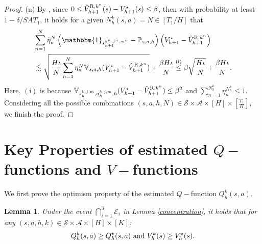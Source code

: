 \documentclass{article}
\newtheorem{lemma}{Lemma}[section]
\newcommand{\R}{\textnormal{R}}
\begin{document}
\begin{proof}
    (n)  By , since $0 \leq \hat{V}_{h+1}^{\R,k^n}(s)-V_{h+1}^{\star}(s) \leq \beta$, then with probability at least $1-\delta/SAT_1$, it holds for a given $N_h^k(s,a) = N \in [T_1/H]$ that
\begin{align*}
    &\sum_{n=1}^{N} \Tilde{\eta}_n^{N}\left(\mathbbm{1}_{s_{h+1}^{k^n,j^n,m^n}}-\mathbb{P}_{s, a,h}\right)\left(V_{h+1}^{\star}-\hat{V}_{h+1}^{\R,k^n}\right)\nonumber\\
    &\lesssim \sqrt{\frac{H\iota}{N} \sum_{n=1}^{N} \eta_n^{N} \mathbb{V}_{s, a,h}(V_{h+1}^{\star}-\hat{V}_{h+1}^{\R,k^n})} + \frac{\beta H\iota}{N} \overset{\mathrm{(i)}}{\leq} \beta \sqrt{\frac{H\iota}{N}} + \frac{\beta H\iota}{N}.
    \end{align*}
    Here, $\mathrm{(i)}$ is because 
    $\mathbb{V}_{s_h^{k,j,m}, a_h^{k,j,m},h}(V_{h+1}^{\star}-\hat{V}_{h+1}^{\R,k^n}) \leq \beta^2$ and $\sum_{n=1}^{N_h^k} \eta_n^{N_h^k} \leq 1$. Considering all the possible combinations $(s,a,h,N) \in \mathcal{S} \times \mathcal{A} \times [H] \times [\frac{T_1}{H}]$, we finish the proof.
\end{proof}
\section{\texorpdfstring{Key Properties of estimated $Q-$functions and $V-$functions}{Key Properties of estimated Q-functions and V-functions}}
\label{QVproperty}
We first prove the optimism property of the estimated $Q-$function $Q_h^k(s,a)$.
\begin{lemma}
\label{Q}
Under the event $\bigcap_{i=1}^{3}\mathcal{E}_i$ in Lemma \ref{concentration}, it holds that for any $(s,a,h,k) \in  \mathcal{S} \times \mathcal{A} \times [H]\times[K]$:
    $$Q_h^k(s,a) \geq Q_h^{\star}(s,a) \textnormal{ and } V_h^k(s) \geq V_h^\star(s).$$
\end{lemma}
\end{document}
